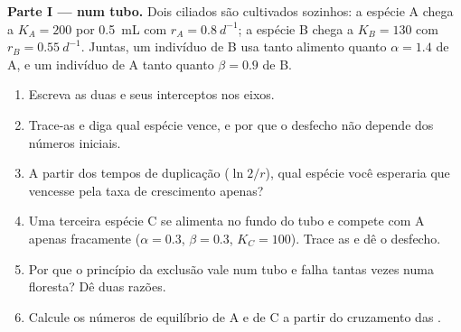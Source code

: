\begin{problem}
\label{pb:b1:species-interactions:1}

\medskip
\noindent\textbf{Parte I ---  num tubo.}
Dois ciliados são cultivados sozinhos: a espécie A chega a
$K_A = 200$ por \qty{0.5}{mL} com $r_A = \qty{0.8}{d^{-1}}$; a espécie
B chega a $K_B = 130$ com $r_B = \qty{0.55}{d^{-1}}$. Juntas, um
indivíduo de B usa tanto alimento quanto $\alpha = 1.4$ de A, e um
indivíduo de A tanto quanto $\beta = 0.9$ de B.
\begin{enumerate}
  \item Escreva as duas  e seus interceptos nos eixos.
  \item Trace-as e diga qual espécie vence, e por que o desfecho não
        depende dos números iniciais.
  \item A partir dos tempos de duplicação ($\ln 2/r$), qual espécie
        você esperaria que vencesse pela taxa de crescimento apenas?
  \item Uma terceira espécie C se alimenta no fundo do tubo e compete
        com A apenas fracamente ($\alpha = 0.3$, $\beta = 0.3$,
        $K_C = 100$). Trace as  e dê o desfecho.
  \item Por que o princípio da exclusão vale num tubo e falha tantas
        vezes numa floresta? Dê duas razões.
  \item Calcule os números de equilíbrio de A e de C a partir do
        cruzamento das .
\end{enumerate}


\end{problem}
